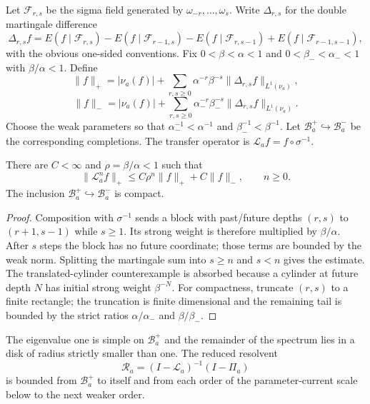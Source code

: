 Let $\mathcal F_{r,s}$ be the sigma field generated by
$\omega_{-r},\ldots,\omega_s$.  Write $\Delta_{r,s}$ for the double martingale
difference
\[
 \Delta_{r,s}f=E(f\mid\mathcal F_{r,s})
 -E(f\mid\mathcal F_{r-1,s})
 -E(f\mid\mathcal F_{r,s-1})
 +E(f\mid\mathcal F_{r-1,s-1}),
\]
with the obvious one-sided conventions.  Fix
$0<\beta<\alpha<1$ and $0<\beta_-<\alpha_-<1$ with
$\beta/\alpha<1$.  Define
\[
 \|f\|_+=|\nu_a(f)|+
 \sum_{r,s\ge0}\alpha^{-r}\beta^{-s}
 \|\Delta_{r,s}f\|_{L^1(\nu_a)},
\]
\[
 \|f\|_-=|\nu_a(f)|+
 \sum_{r,s\ge0}\alpha_-^{-r}\beta_-^{-s}
 \|\Delta_{r,s}f\|_{L^1(\nu_a)}.
\]
Choose the weak parameters so that
$\alpha_-^{-1}<\alpha^{-1}$ and $\beta_-^{-1}<\beta^{-1}$.
Let $\mathscr B_a^+\hookrightarrow\mathscr B_a^-$ be the corresponding
completions.  The transfer operator is
$\mathcal L_af=f\circ\sigma^{-1}$.

\begin{lemma}
\label{lem:r9-a1-ly}
There are $C<\infty$ and $\rho=\beta/\alpha<1$ such that
\[
 \|\mathcal L_a^nf\|_+
 \le C\rho^n\|f\|_+ + C\|f\|_-,
 \qquad n\ge0.
\]
The inclusion $\mathscr B_a^+\hookrightarrow\mathscr B_a^-$ is compact.
\end{lemma}

\begin{proof}
Composition with $\sigma^{-1}$ sends a block with past/future depths $(r,s)$
to $(r+1,s-1)$ while $s\ge1$.  Its strong weight is therefore multiplied by
$\beta/\alpha$.  After $s$ steps the block has no future coordinate; those
terms are bounded by the weak norm.  Splitting the martingale sum into
$s\ge n$ and $s<n$ gives the estimate.  The translated-cylinder counterexample
is absorbed because a cylinder at future depth $N$ has initial strong weight
$\beta^{-N}$.  For compactness, truncate $(r,s)$ to a finite rectangle; the
truncation is finite dimensional and the remaining tail is bounded by the
strict ratios $\alpha/\alpha_-$ and $\beta/\beta_-$.
\end{proof}

\begin{theorem}
\label{thm:r9-a1-spectrum}
The eigenvalue one is simple on $\mathscr B_a^+$ and the remainder of the
spectrum lies in a disk of radius strictly smaller than one.  The reduced
resolvent
\[
 \mathcal R_a=(I-\mathcal L_a)^{-1}(I-\Pi_a)
\]
is bounded from $\mathscr B_a^+$ to itself and from each order of the
parameter-current scale below to the next weaker order.
\end{theorem}

